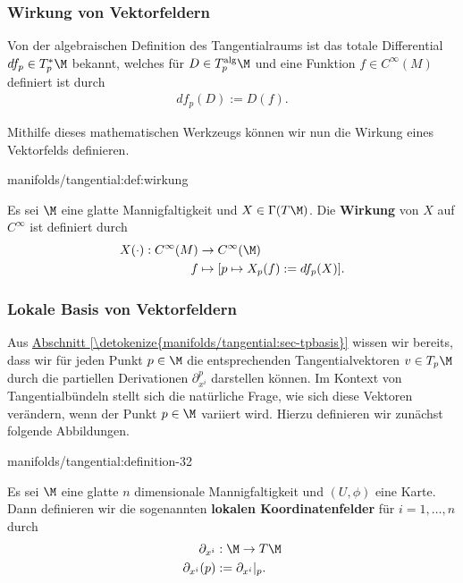 \documentclass[letterpaper,10pt,german]{jupyterBook}
\begin{document}
\subsubsection{Wirkung von Vektorfeldern}
\label{\detokenize{manifolds/tangential:wirkung-von-vektorfeldern}}
\par
Von der algebraischen Definition des Tangentialraums ist das totale Differential \(df_p\in T^\ast_p\M\) bekannt, welches für \(D\in T^{\text{alg}}_p\M\) und eine Funktion \(f\in C^\infty(M)\) definiert ist durch
\begin{align*}
df_p(D):= D(f).
\end{align*}
\par
Mithilfe dieses mathematischen Werkzeugs können wir nun die Wirkung eines Vektorfelds definieren.
\begin{definition}{}{manifolds/tangential:def:wirkung}



\par
Es sei \(\M\) eine glatte Mannigfaltigkeit und \(X\in\Gamma(T\M)\).
Die \textbf{Wirkung} von \(X\) auf \(C^\infty\) ist definiert durch
\begin{align*}
X(\cdot):C^\infty(M) &\to C^\infty(\M)\\
f &\mapsto [p\mapsto X_p(f) := df_p(X)].
\end{align*}\end{definition}


\subsubsection{Lokale Basis von Vektorfeldern}
\label{\detokenize{manifolds/tangential:lokale-basis-von-vektorfeldern}}
\par
Aus \hyperref[\detokenize{manifolds/tangential:sec-tpbasis}]{Abschnitt \ref{\detokenize{manifolds/tangential:sec-tpbasis}}} wissen wir bereits, dass wir für jeden Punkt \(p\in\M\) die entsprechenden Tangentialvektoren \(v\in T_p\M\) durch die partiellen Derivationen \(\partial_{x^i}^p\) darstellen können.
Im Kontext von Tangentialbündeln stellt sich die natürliche Frage, wie sich diese Vektoren verändern, wenn der Punkt \(p\in\M\) variiert wird.
Hierzu definieren wir zunächst folgende Abbildungen.
\begin{definition}{}{manifolds/tangential:definition-32}



\par
Es sei \(\M\) eine glatte \(n\) dimensionale Mannigfaltigkeit und \((U,\phi)\) eine Karte.
Dann definieren wir die sogenannten \textbf{lokalen Koordinatenfelder} für \(i=1,\ldots,n\) durch
\begin{align*}
\partial_{x^{i}}&:\M\to T\M\\
\partial_{x^{i}}(p)&:= \partial_{x^{i}}\rvert_p.\end{align*}\end{definition}
\end{document}
